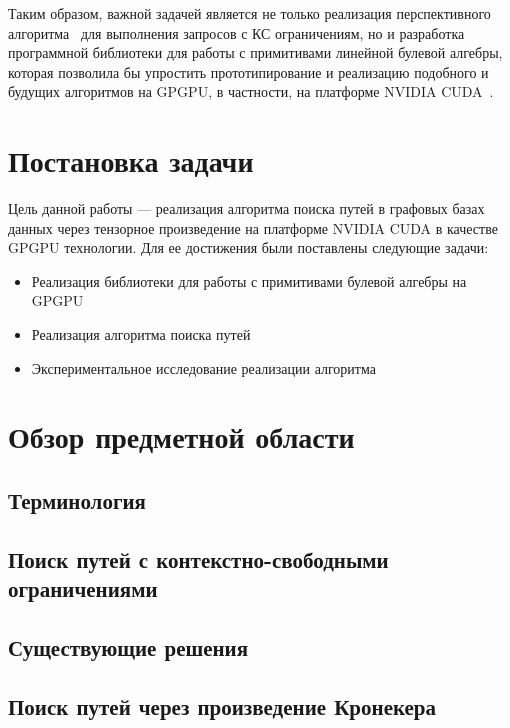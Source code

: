 \documentclass[14pt]{matmex-diploma-custom}
\begin{document}
Таким образом, важной задачей является не только реализация перспективного 
алгоритма~\cite{inbook:kronecker_cfpq_adbis} для выполнения запросов с КС ограничениям,
но и разработка программной библиотеки для работы с примитивами линейной булевой алгебры, 
которая позволила бы упростить прототипирование и реализацию подобного и будущих алгоритмов на 
GPGPU, в частности, на платформе NVIDIA CUDA~\cite{net:cuda_toolkit_docs}.

\section{Постановка задачи}

Цель данной работы --- реализация алгоритма поиска путей в графовых базах данных через тензорное
произведение на платформе NVIDIA CUDA в качестве GPGPU технологии. Для ее достижения были 
поставлены следующие задачи:

\begin{itemize}
    \item Реализация библиотеки для работы с примитивами булевой алгебры на GPGPU
    \item Реализация алгоритма поиска путей
    \item Экспериментальное исследование реализации алгоритма
\end{itemize}

\section{Обзор предметной области}

\subsection{Терминология}

\subsection{Поиск путей с контекстно-свободными ограничениями}

\subsection{Существующие решения}

\subsection{Поиск путей через произведение Кронекера}
\end{document}
